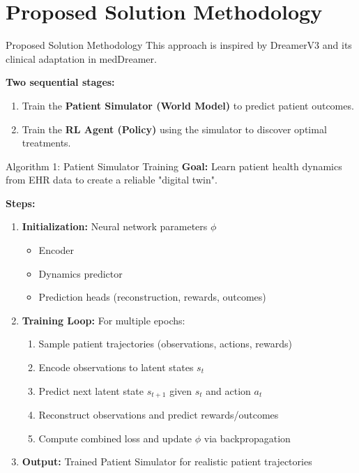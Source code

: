\documentclass[11pt]{beamer}
\begin{document}
\section{Proposed Solution Methodology}
\begin{frame}{Proposed Solution Methodology}
This approach is inspired by DreamerV3 and its clinical adaptation in medDreamer.  

\textbf{Two sequential stages:}
\begin{enumerate}
    \item Train the \textbf{Patient Simulator (World Model)} to predict patient outcomes.  
    \item Train the \textbf{RL Agent (Policy)} using the simulator to discover optimal treatments.
\end{enumerate}
\end{frame}

\begin{frame}{Algorithm 1: Patient Simulator Training}
\textbf{Goal:} Learn patient health dynamics from EHR data to create a reliable "digital twin".  

\textbf{Steps:}
\begin{enumerate}
    \item \textbf{Initialization:} Neural network parameters $\phi$  
    \begin{itemize}
        \item Encoder
        \item Dynamics predictor
        \item Prediction heads (reconstruction, rewards, outcomes)
    \end{itemize}
    \item \textbf{Training Loop:} For multiple epochs:
    \begin{enumerate}
        \item Sample patient trajectories (observations, actions, rewards)
        \item Encode observations to latent states $s_t$
        \item Predict next latent state $s_{t+1}$ given $s_t$ and action $a_t$
        \item Reconstruct observations and predict rewards/outcomes
        \item Compute combined loss and update $\phi$ via backpropagation
    \end{enumerate}
    \item \textbf{Output:} Trained Patient Simulator for realistic patient trajectories
\end{enumerate}
\end{frame}
\end{document}
